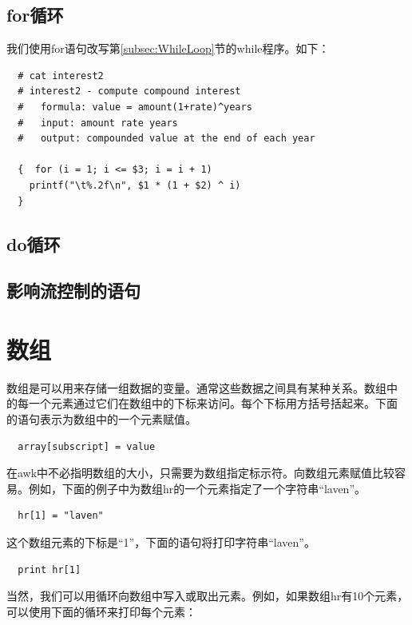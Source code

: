 \subsection{for循环}
\label{subsec:ForLoop}

我们使用for语句改写第\ref{subsec:WhileLoop}节的while程序。如下：

\begin{verbatim}
  # cat interest2
  # interest2 - compute compound interest
  #   formula: value = amount(1+rate)^years
  #   input: amount rate years
  #   output: compounded value at the end of each year
  
  {  for (i = 1; i <= $3; i = i + 1)
    printf("\t%.2f\n", $1 * (1 + $2) ^ i)
  }
\end{verbatim}

\subsection{do循环}

\subsection{影响流控制的语句}

\section{数组}

数组是可以用来存储一组数据的变量。通常这些数据之间具有某种关系。数组中
的每一个元素通过它们在数组中的下标来访问。每个下标用方括号括起来。下面
的语句表示为数组中的一个元素赋值。

\begin{verbatim}
  array[subscript] = value
\end{verbatim}

在awk中不必指明数组的大小，只需要为数组指定标示符。向数组元素赋值比较容
易。例如，下面的例子中为数组hr的一个元素指定了一个字符串“laven”。

\begin{verbatim}
  hr[1] = "laven"
\end{verbatim}

这个数组元素的下标是“1”，下面的语句将打印字符串“laven”。

\begin{verbatim}
  print hr[1]
\end{verbatim}

当然，我们可以用循环向数组中写入或取出元素。例如，如果数组hr有10个元素，
可以使用下面的循环来打印每个元素：

